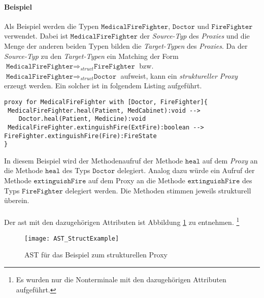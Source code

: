\paragraph{Beispiel}
Als Beispiel werden die Typen $\texttt{MedicalFireFighter}$, $\texttt{Doctor}$ und $\texttt{FireFighter}$ verwendet. Dabei ist $\texttt{MedicalFireFighter}$ der \emph{Source-Typ} des \emph{Proxies} und die Menge der anderen beiden Typen bilden die \emph{Target-Typen} des \emph{Proxies}. Da der \emph{Source-Typ }zu den \emph{Target-Typen} ein Matching der Form $\texttt{MedicalFireFighter} \Rightarrow_{struct} \texttt{FireFighter}$ bzw. $\texttt{MedicalFireFighter} \Rightarrow_{struct} \texttt{Doctor}$ aufweist, kann ein \emph{struktureller Proxy} erzeugt werden. Ein solcher ist in folgendem Listing aufgeführt.
\begin{lstlisting}[style = dsl, caption = Struktureller Proxy für MedicalFireFighter, captionpos = b]
proxy for MedicalFireFighter with [Doctor, FireFighter]{
 MedicalFireFighter.heal(Patient, MedCabinet):void -->
    Doctor.heal(Patient, Medicine):void
 MedicalFireFighter.extinguishFire(ExtFire):boolean --> FireFighter.extinguishFire(Fire):FireState
}
\end{lstlisting}
In diesem Beispiel wird der Methodenaufruf der Methode $\texttt{heal}$ auf dem \emph{Proxy} an die Methode $\texttt{heal}$ des Typs $\texttt{Doctor}$ delegiert. Analog dazu würde ein Aufruf der Methode $\texttt{extinguishFire}$ auf dem Proxy an die Methode $\texttt{extinguishFire}$ des Typs $\texttt{FireFighter}$ delegiert werden. Die Methoden stimmen jeweils strukturell überein.
\\\\
Der \acrshort{ast} mit den dazugehörigen Attributen ist Abbildung \ref{fig:ASTSTRUCT} zu entnehmen. \footnote{Es wurden nur die Nonterminale mit den dazugehörigen Attributen aufgeführt.}
\begin{figure}[h!]
\centering
\texttt{[image: AST\_StructExample]}
\caption{AST für das Beispiel zum strukturellen Proxy}
\label{fig:ASTSTRUCT}
\end{figure}
\noindent
